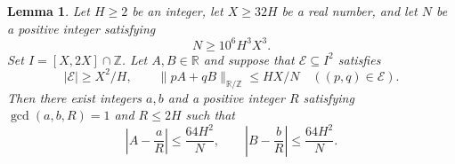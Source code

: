 \documentclass[twoside]{aomart}
\theoremstyle{paperplain}
\newtheorem{lemma}[theorem]{Lemma}
\theoremstyle{paperdefinition}
\numberwithin{equation}{section}
\begin{document}
\begin{samepage}
\begin{lemma}\label{lem:linear_dense}
Let $H\ge2$ be an integer, let $X\ge32H$ be a real number, and
let $N$ be a positive integer satisfying
\begin{equation*}
 N\ge10^6H^3X^3.
\end{equation*}
Set $I=[X,2X]\cap\mathbb Z$.  Let $A,B\in\mathbb R$ and suppose that
$\mathcal E\subseteq I^2$ satisfies
\begin{equation*}
 |\mathcal E|\ge X^2/H,\qquad
 \|pA+qB\|_{\mathbb R/\mathbb Z}\le HX/N
       \quad((p,q)\in\mathcal E).
\end{equation*}
Then there exist integers $a,b$ and a positive integer $R$
satisfying $\gcd(a,b,R)=1$ and $R\le2H$ such that
\begin{equation}
 \left|A-\frac aR\right|\le\frac{64H^2}N,
 \qquad
 \left|B-\frac bR\right|\le\frac{64H^2}N.
 \label{sc:dense-linear-phase-output}
\end{equation}
\end{lemma}
\end{samepage}
\end{document}
